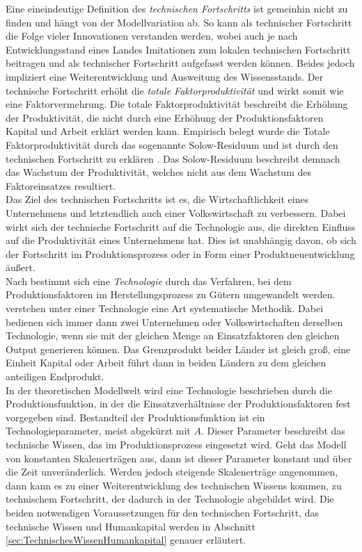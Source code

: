 Eine eineindeutige Definition des \emph{technischen Fortschritts} ist gemeinhin nicht zu finden und hängt von der Modellvariation ab. So kann als technischer Fortschritt die Folge vieler Innovationen verstanden werden, wobei auch je nach Entwicklungsstand eines Landes Imitationen zum lokalen technischen Fortschritt beitragen und als technischer Fortschritt aufgefasst werden können. Beides jedoch impliziert eine Weiterentwicklung und Ausweitung des Wissensstands. Der technische Fortschritt erhöht die \emph{totale Faktorproduktivität} und wirkt somit wie eine Faktorvermehrung. Die totale Faktorproduktivität beschreibt die Erhöhung der Produktivität, die nicht durch eine Erhöhung der Produktionsfaktoren Kapital und Arbeit erklärt werden kann. Empirisch belegt wurde die Totale Faktorproduktivität durch das sogenannte Solow-Residuum und ist durch den technischen Fortschritt zu erklären \cite{Solow.1957}. Das Solow-Residuum beschreibt demnach das Wachstum der Produktivität, welches nicht aus dem Wachstum des Faktoreinsatzes resultiert.\\
%
Das Ziel des technischen Fortschritts ist es, die Wirtschaftlichkeit eines Unternehmens und letztendlich auch einer Volkswirtschaft zu verbessern. Dabei wirkt sich der technische Fortschritt auf die Technologie aus, die direkten Einfluss auf die Produktivität eines Unternehmens hat. Dies ist unabhängig davon, ob sich der Fortschritt im Produktionsprozess oder in Form einer Produktneuentwicklung äußert.\\
%
Nach \cite[Kapitel 1]{Barro.2004} bestimmt sich eine \emph{Technologie} durch das Verfahren, bei dem Produktionsfaktoren im Herstellungsprozess zu Gütern umgewandelt werden. \cite[Kapitel 5,S.139]{Krugman.2015} verstehen unter einer Technologie eine Art systematische Methodik. Dabei bedienen sich immer dann zwei Unternehmen oder Volkswirtschaften derselben Technologie, wenn sie mit der gleichen Menge an Einsatzfaktoren den gleichen Output generieren können. Das Grenzprodukt beider Länder ist gleich groß, eine Einheit Kapital oder Arbeit führt dann in beiden Ländern zu dem gleichen anteiligen Endprodukt.\\
%
In der theoretischen Modellwelt wird eine Technologie beschrieben durch die Produktionsfunktion, in der die Einsatzverhältnisse der Produktionsfaktoren fest vorgegeben sind. Bestandteil der Produktionsfunktion ist ein Technologieparameter, meist abgekürzt mit $A$. Dieser Parameter beschreibt das technische Wissen, das im Produktionsprozess eingesetzt wird. Geht das Modell von konstanten Skalenerträgen aus, dann ist dieser Parameter konstant und über die Zeit unveränderlich. Werden jedoch steigende Skalenerträge angenommen, dann kann es zu einer Weiterentwicklung des technischen Wissens kommen, zu technischem Fortschritt, der dadurch in der Technologie abgebildet wird. Die beiden notwendigen Voraussetzungen für den technischen Fortschritt, das technische Wissen und Humankapital werden in Abschnitt \ref{sec:TechnischesWissenHumankapital} genauer erläutert.\\
